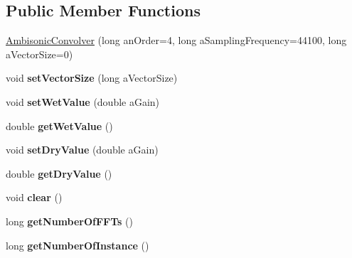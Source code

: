 \subsection*{Public Member Functions}
\begin{DoxyCompactItemize}
\item 
\hyperlink{class_ambisonic_convolver_a738ca279b391cf1adba9e2004ac74c52}{Ambisonic\-Convolver} (long an\-Order=4, long a\-Sampling\-Frequency=44100, long a\-Vector\-Size=0)
\item 
\hypertarget{class_ambisonic_convolver_a19eaf99ec2b0e1aa24c5f7573acbc5a1}{void {\bfseries set\-Vector\-Size} (long a\-Vector\-Size)}\label{class_ambisonic_convolver_a19eaf99ec2b0e1aa24c5f7573acbc5a1}

\item 
\hypertarget{class_ambisonic_convolver_af6dd66207e15259eb50e47ceaa52d5b3}{void {\bfseries set\-Wet\-Value} (double a\-Gain)}\label{class_ambisonic_convolver_af6dd66207e15259eb50e47ceaa52d5b3}

\item 
\hypertarget{class_ambisonic_convolver_ae2ce72c73e2b21ff68b2d8d3b0d9020b}{double {\bfseries get\-Wet\-Value} ()}\label{class_ambisonic_convolver_ae2ce72c73e2b21ff68b2d8d3b0d9020b}

\item 
\hypertarget{class_ambisonic_convolver_a678485cada7a73c7b12dc9c1c5dc378f}{void {\bfseries set\-Dry\-Value} (double a\-Gain)}\label{class_ambisonic_convolver_a678485cada7a73c7b12dc9c1c5dc378f}

\item 
\hypertarget{class_ambisonic_convolver_abdff564a23f34b48136f46123e491e42}{double {\bfseries get\-Dry\-Value} ()}\label{class_ambisonic_convolver_abdff564a23f34b48136f46123e491e42}

\item 
\hypertarget{class_ambisonic_convolver_a635427971d5be1a42658093b2156ae2a}{void {\bfseries clear} ()}\label{class_ambisonic_convolver_a635427971d5be1a42658093b2156ae2a}

\item 
\hypertarget{class_ambisonic_convolver_ab6f347d41f6cea3de5758b12a510fdd5}{long {\bfseries get\-Number\-Of\-F\-F\-Ts} ()}\label{class_ambisonic_convolver_ab6f347d41f6cea3de5758b12a510fdd5}

\item 
\hypertarget{class_ambisonic_convolver_a1e371e8291a2e2bc3ccff4ff49c90d15}{long {\bfseries get\-Number\-Of\-Instance} ()}\label{class_ambisonic_convolver_a1e371e8291a2e2bc3ccff4ff49c90d15}


\end{DoxyCompactItemize}
